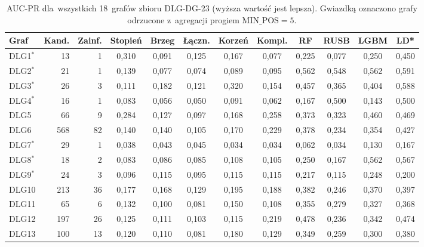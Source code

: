 \begin{table}[ht]
\centering
\caption[AUC-PR dla~wszystkich 18~grafów DLG-DG-23]{AUC-PR dla~wszystkich 18~grafów zbioru DLG-DG-23 (wyższa wartość jest lepsza). Gwiazdką oznaczono grafy odrzucone z~agregacji progiem $\mathrm{MIN\_POS} = 5$.}
\label{tab:dodb-auc-pr}
\footnotesize
\setlength{\tabcolsep}{3.5pt}
\begin{tabular}{lrrccccccccc}
\toprule
\textbf{Graf} & \textbf{Kand.} & \textbf{Zainf.} & \textbf{Stopień} & \textbf{Brzeg} & \textbf{Łączn.} & \textbf{Korzeń} & \textbf{Kompl.} & \textbf{RF} & \textbf{RUSB} & \textbf{LGBM} & \textbf{LD*} \\
\midrule
DLG1$^{*}$ & 13 & 1 & 0{,}310 & 0{,}091 & 0{,}125 & 0{,}167 & 0{,}077 & 0{,}225 & 0{,}077 & 0{,}250 & 0{,}450 \\
DLG2$^{*}$ & 21 & 1 & 0{,}139 & 0{,}077 & 0{,}074 & 0{,}089 & 0{,}095 & 0{,}562 & 0{,}548 & 0{,}562 & 0{,}591 \\
DLG3$^{*}$ & 26 & 3 & 0{,}111 & 0{,}182 & 0{,}121 & 0{,}320 & 0{,}154 & 0{,}457 & 0{,}365 & 0{,}404 & 0{,}588 \\
DLG4$^{*}$ & 16 & 1 & 0{,}083 & 0{,}056 & 0{,}050 & 0{,}091 & 0{,}062 & 0{,}167 & 0{,}500 & 0{,}143 & 0{,}500 \\
DLG5 & 66 & 9 & 0{,}284 & 0{,}127 & 0{,}097 & 0{,}168 & 0{,}258 & 0{,}373 & 0{,}323 & 0{,}460 & 0{,}469 \\
DLG6 & 568 & 82 & 0{,}140 & 0{,}140 & 0{,}105 & 0{,}170 & 0{,}229 & 0{,}378 & 0{,}234 & 0{,}354 & 0{,}427 \\
DLG7$^{*}$ & 29 & 1 & 0{,}038 & 0{,}043 & 0{,}045 & 0{,}034 & 0{,}034 & 0{,}062 & 0{,}034 & 0{,}130 & 0{,}167 \\
DLG8$^{*}$ & 18 & 2 & 0{,}083 & 0{,}086 & 0{,}085 & 0{,}108 & 0{,}105 & 0{,}250 & 0{,}167 & 0{,}562 & 0{,}567 \\
DLG9$^{*}$ & 24 & 3 & 0{,}096 & 0{,}115 & 0{,}095 & 0{,}115 & 0{,}115 & 0{,}217 & 0{,}115 & 0{,}248 & 0{,}200 \\
DLG10 & 213 & 36 & 0{,}177 & 0{,}168 & 0{,}129 & 0{,}195 & 0{,}188 & 0{,}382 & 0{,}246 & 0{,}370 & 0{,}397 \\
DLG11 & 65 & 6 & 0{,}132 & 0{,}100 & 0{,}081 & 0{,}150 & 0{,}108 & 0{,}355 & 0{,}279 & 0{,}327 & 0{,}368 \\
DLG12 & 197 & 26 & 0{,}125 & 0{,}111 & 0{,}103 & 0{,}115 & 0{,}219 & 0{,}478 & 0{,}236 & 0{,}342 & 0{,}474 \\
DLG13 & 100 & 13 & 0{,}120 & 0{,}110 & 0{,}081 & 0{,}180 & 0{,}129 & 0{,}349 & 0{,}259 & 0{,}300 & 0{,}380 \\

\end{tabular}
\end{table}
